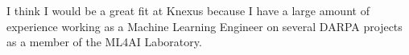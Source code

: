 I think I would be a great fit at Knexus because I have a large amount of experience working as a Machine Learning Engineer on several DARPA projects as a member of the ML4AI Laboratory.